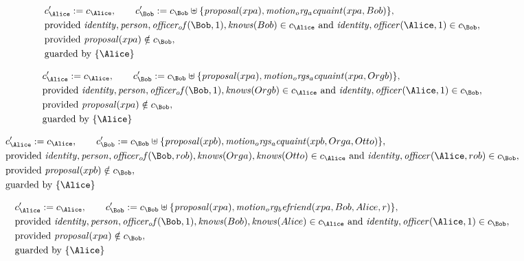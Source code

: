 \begin{align*}
&
c'_
{
\Alice
}
 := 
c_
{
\Alice
}
, \qquad 
c'_
{
\Bob
}
 := 
c_
{
\Bob
}
 \uplus 
\{
\mathit{
proposal
}
(
xpa
)
,
\mathit{
motion_org_acquaint
}
(
xpa
,
Bob
)
\}
,\\
&
\text{provided } 
\mathit{
identity
}
,
\mathit{
person
}
,
\mathit{
officer_of
}
(
\Bob
,
1
)
,
\mathit{
knows
}
(
Bob
)
 \in c_
{
\Alice
}
 \text{ and } 
\mathit{
identity
}
,
\mathit{
officer
}
(
\Alice
,
1
)
 \in c_
{
\Bob
}
,\\
&
\text{provided } 
\mathit{
proposal
}
(
xpa
)
 \notin c_
{
\Bob
}
,\\
&
\text{guarded by } \{
\Alice
\}
\end{align*}

\begin{align*}
&
c'_
{
\Alice
}
 := 
c_
{
\Alice
}
, \qquad 
c'_
{
\Bob
}
 := 
c_
{
\Bob
}
 \uplus 
\{
\mathit{
proposal
}
(
xpa
)
,
\mathit{
motion_orgs_acquaint
}
(
xpa
,
Orgb
)
\}
,\\
&
\text{provided } 
\mathit{
identity
}
,
\mathit{
person
}
,
\mathit{
officer_of
}
(
\Bob
,
1
)
,
\mathit{
knows
}
(
Orgb
)
 \in c_
{
\Alice
}
 \text{ and } 
\mathit{
identity
}
,
\mathit{
officer
}
(
\Alice
,
1
)
 \in c_
{
\Bob
}
,\\
&
\text{provided } 
\mathit{
proposal
}
(
xpa
)
 \notin c_
{
\Bob
}
,\\
&
\text{guarded by } \{
\Alice
\}
\end{align*}

\begin{align*}
&
c'_
{
\Alice
}
 := 
c_
{
\Alice
}
, \qquad 
c'_
{
\Bob
}
 := 
c_
{
\Bob
}
 \uplus 
\{
\mathit{
proposal
}
(
xpb
)
,
\mathit{
motion_orgs_acquaint
}
(
xpb
,
Orga
,
Otto
)
\}
,\\
&
\text{provided } 
\mathit{
identity
}
,
\mathit{
person
}
,
\mathit{
officer_of
}
(
\Bob
,
rob
)
,
\mathit{
knows
}
(
Orga
)
,
\mathit{
knows
}
(
Otto
)
 \in c_
{
\Alice
}
 \text{ and } 
\mathit{
identity
}
,
\mathit{
officer
}
(
\Alice
,
rob
)
 \in c_
{
\Bob
}
,\\
&
\text{provided } 
\mathit{
proposal
}
(
xpb
)
 \notin c_
{
\Bob
}
,\\
&
\text{guarded by } \{
\Alice
\}
\end{align*}

\begin{align*}
&
c'_
{
\Alice
}
 := 
c_
{
\Alice
}
, \qquad 
c'_
{
\Bob
}
 := 
c_
{
\Bob
}
 \uplus 
\{
\mathit{
proposal
}
(
xpa
)
,
\mathit{
motion_org_befriend
}
(
xpa
,
Bob
,
Alice
,
r
)
\}
,\\
&
\text{provided } 
\mathit{
identity
}
,
\mathit{
person
}
,
\mathit{
officer_of
}
(
\Bob
,
1
)
,
\mathit{
knows
}
(
Bob
)
,
\mathit{
knows
}
(
Alice
)
 \in c_
{
\Alice
}
 \text{ and } 
\mathit{
identity
}
,
\mathit{
officer
}
(
\Alice
,
1
)
 \in c_
{
\Bob
}
,\\
&
\text{provided } 
\mathit{
proposal
}
(
xpa
)
 \notin c_
{
\Bob
}
,\\
&
\text{guarded by } \{
\Alice
\}
\end{align*}
